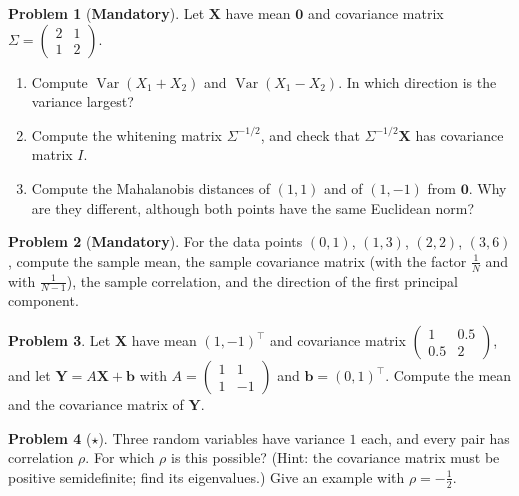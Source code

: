 \documentclass[11pt]{article}
\theoremstyle{definition}
\newtheorem{problem}{Problem}[section]
\newcommand{\mandatory}{\textcolor{red!70!black}{\textbf{Mandatory}}}
\DeclareMathOperator{\Var}{Var}
\begin{document}
\begin{problem}[\mandatory]\label{pr:cov-whitening}
    Let $\mathbf{X}$ have mean $\mathbf{0}$ and covariance matrix $\Sigma = \begin{pmatrix} 2 & 1 \\ 1 & 2 \end{pmatrix}$.
    \begin{enumerate}[label=(\alph*)]
        \item Compute $\Var(X_1 + X_2)$ and $\Var(X_1 - X_2)$. In which direction is the variance largest?
        \item Compute the whitening matrix $\Sigma^{-1/2}$, and check that $\Sigma^{-1/2}\mathbf{X}$ has covariance matrix $I$.
        \item Compute the Mahalanobis distances of $(1, 1)$ and of $(1, -1)$ from $\mathbf{0}$. Why are they different, although both points have the same Euclidean norm?
    \end{enumerate}
\end{problem}

\begin{problem}[\mandatory]\label{pr:sample-cov}
    For the data points $(0, 1)$, $(1, 3)$, $(2, 2)$, $(3, 6)$, compute the sample mean, the sample covariance matrix (with the factor $\frac{1}{N}$ and with $\frac{1}{N - 1}$), the sample correlation, and the direction of the first principal component.
\end{problem}

\begin{problem}\label{pr:affine-cov}
    Let $\mathbf{X}$ have mean $(1, -1)^\top$ and covariance matrix $\begin{pmatrix} 1 & 0.5 \\ 0.5 & 2 \end{pmatrix}$, and let $\mathbf{Y} = A\mathbf{X} + \mathbf{b}$ with $A = \begin{pmatrix} 1 & 1 \\ 1 & -1 \end{pmatrix}$ and $\mathbf{b} = (0, 1)^\top$. Compute the mean and the covariance matrix of $\mathbf{Y}$.
\end{problem}

\begin{problem}[$\star$]\label{pr:equicorrelation}
    Three random variables have variance $1$ each, and every pair has correlation $\rho$. For which $\rho$ is this possible? (Hint: the covariance matrix must be positive semidefinite; find its eigenvalues.) Give an example with $\rho = -\frac{1}{2}$.
\end{problem}
\end{document}
